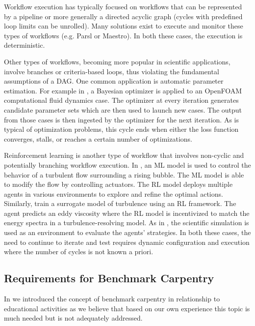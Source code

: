 \documentclass[utf8]{FrontiersinVancouver} %
\begin{document}
Workflow execution has typically focused on workflows that can be represented by a pipeline or more generally a directed acyclic graph (cycles with predefined loop limits can be unrolled). Many solutions exist to execute and monitor these types of workflows (e.g. Parsl or Maestro). In both these cases, the execution is deterministic.

Other types of workflows, becoming more popular in scientific applications, involve branches or criteria-based loops, thus violating the fundamental assumptions of a DAG. One common application is automatic parameter estimation.  For example in \citep{Maric2024OpenFOAM}, a Bayesian optimizer is applied to an OpenFOAM computational fluid dynamics case. The optimizer at every iteration generates candidate parameter sets which are then used to launch new cases. The output from those cases is then ingested by the optimizer for the next iteration. As is typical of optimization problems, this cycle ends when either the loss function converges, stalls, or reaches a certain number of optimizations.

Reinforcement learning is another type of workflow that involves non-cyclic and potentially branching workflow execution. In \citep{Font2024}, an ML model is used to control the behavior of a turbulent flow surrounding a rising bubble. The ML model is able to modify the flow by controlling actuators.  The RL model deploys multiple agents in various environments to explore and refine the optimal actions. Similarly, \citep{kurz2023deep} train a surrogate model of turbulence using an RL framework. The agent predicts an eddy viscosity where the RL model is incentivized to match the energy spectra in a turbulence-resolving model. As in \citep{Font2024}, the scientific simulation is used as an environment to evaluate the agents' strategies. In both these cases, the need to continue to iterate and test requires dynamic configuration and execution where the number of cycles is not known a priori.



\subsection{Requirements for Benchmark Carpentry}
\label{sec:carpentry}

In \citep{las-frontiers-edu} we introduced the concept of benchmark carpentry in relationship to educational activities as we believe that based on our own experience this topic is much needed but is not adequately addressed. 
\end{document}
